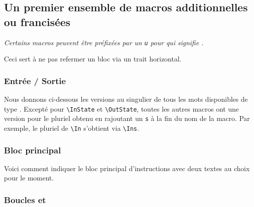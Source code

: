 \documentclass[12pt,a4paper]{article}
\begin{document}

\subsection{Un premier ensemble de macros additionnelles ou francisées}

\begin{frame-gene}
	\centering\itshape
	Certains macros peuvent être préfixées par un \verb+u+ pour  qui signifie .
	
	Ceci sert à ne pas refermer un bloc via un trait horizontal.
\end{frame-gene}





\subsubsection{Entrée / Sortie}

Nous donnons ci-dessous les versions au singulier de tous les mots disponibles de type .
Excepté pour \verb+\InState+ et \verb+\OutState+, toutes les autres macros ont une version pour le pluriel obtenu en rajoutant un \verb+s+ à la fin du nom de la macro.
Par exemple, le pluriel de \verb+\In+ s'obtient via \verb+\Ins+.



\subsubsection{Bloc principal}

Voici comment indiquer le bloc principal d'instructions avec deux textes au choix pour le moment.

\newpage



\subsubsection{Boucles \TTfor{} et \TTwhile{}}
\end{document}
